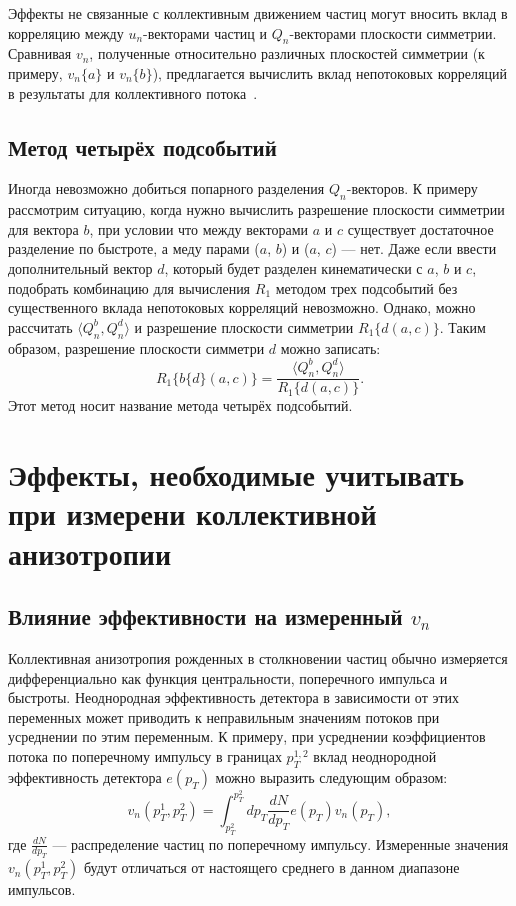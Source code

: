 Эффекты не связанные с коллективным движением частиц могут вносить вклад в корреляцию между $u_n$-векторами частиц и $Q_n$-векторами плоскости симметрии.
Сравнивая $v_n$, полученные относительно различных плоскостей симметрии (к примеру, $v_n\{a\}$ и $v_n\{b\}$), предлагается вычислить вклад непотоковых корреляций в результаты для коллективного потока~\cite{Mamaev:2020qom,Mamaev:2023fpr,Mamaev:2023yhz,Mamaev:2024}. 

\subsection{Метод четырёх подсобытий}

Иногда невозможно добиться попарного разделения $Q_n$-векторов. 
К примеру рассмотрим ситуацию, когда нужно вычислить разрешение плоскости симметрии для вектора $b$, при условии что между векторами $a$ и $c$ существует достаточное разделение по быстроте, а меду парами ($a$, $b$) и ($a$, $c$) --- нет.
Даже если ввести дополнительный вектор $d$, который будет разделен кинематически с $a$, $b$ и $c$, подобрать комбинацию для вычисления $R_1$ методом трех подсобытий без существенного вклада непотоковых корреляций невозможно.
Однако, можно рассчитать $\langle Q_n^b, Q_n^d \rangle$ и разрешение плоскости симметрии $R_1\{d(a,c)\}$.
Таким образом, разрешение плоскости симметри $d$ можно записать:
\begin{equation}
    R_1\{ b\{d\}(a,c) \} = \frac{ \langle Q_n^b, Q_n^d \rangle }{ R_1\{d(a,c)\} }.
    \label{eq:r1_4sub}
\end{equation}
Этот метод носит название метода четырёх подсобытий.

\section{Эффекты, необходимые учитывать при измерени коллективной анизотропии}

\subsection{Влияние эффективности на измеренный $v_n$}

Коллективная анизотропия рожденных в столкновении частиц обычно измеряется дифференциально как функция центральности, поперечного импульса и быстроты.
Неоднородная эффективность детектора в зависимости от этих переменных может приводить к неправильным значениям потоков при усреднении по этим переменным.
К примеру, при усреднении коэффициентов потока по поперечному импульсу в границах $p_T^{1,2}$ вклад неоднородной эффективность детектора $e(p_T)$ можно выразить следующим образом:
\begin{equation}
    v_n(p_T^1, p_T^2) = \int_{p_T^2}^{p_T^2} dp_T \frac{dN}{dp_T} e(p_T) v_n(p_T),
\end{equation}
где $\frac{dN}{dp_T}$ --- распределение частиц по поперечному импульсу.
Измеренные значения $v_n(p_T^1, p_T^2)$ будут отличаться от настоящего среднего в данном диапазоне импульсов.

